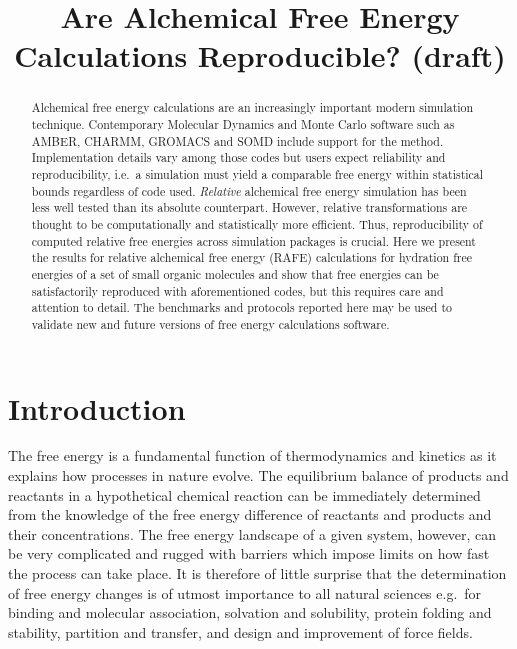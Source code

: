 \documentclass[journal=jctcce,manuscript=article]{achemso}
\title{Are Alchemical Free Energy Calculations Reproducible? (draft)}
\begin{document}
\begin{abstract}
  Alchemical free energy calculations are an increasingly important modern 
  simulation technique.  Contemporary Molecular Dynamics and Monte Carlo 
  software such as AMBER, CHARMM, GROMACS and SOMD include support for the 
  method.  Implementation details vary among those codes but users expect 
  reliability and reproducibility, i.e.\ a simulation must yield a comparable 
  free energy within statistical bounds regardless of code used.  
  \emph{Relative} alchemical free energy simulation has been less well tested 
  than its absolute counterpart.  However, relative transformations are thought 
  to be computationally and statistically more efficient.
  Thus, reproducibility of computed relative free energies across simulation 
  packages is crucial. Here we present the results for relative alchemical free 
  energy (RAFE) calculations for hydration free energies of a set of small 
  organic molecules and show that free energies can be satisfactorily 
  reproduced with aforementioned codes, but this requires care and attention to 
  detail.  The benchmarks and protocols reported here may be used to validate 
  new and future versions of free energy calculations software.  
\end{abstract}

\begin{tocentry}
\end{tocentry}







\section{Introduction}
\label{sec:intro}

The free energy is a fundamental function of thermodynamics and
kinetics as it explains how processes in nature evolve.  The equilibrium balance of products and reactants in
a hypothetical chemical reaction can be immediately determined
from the knowledge of the free energy difference of reactants and
products and their concentrations.  The free energy landscape of a given 
system, however, can be very complicated and rugged with barriers which impose
limits on how fast the process can take place.  It is therefore of
little surprise that the determination of free energy changes is of
utmost importance to all natural sciences e.g.\ for binding and
molecular association, solvation and solubility, protein folding and
stability, partition and transfer, and design and improvement of force
fields. 
\end{document}
